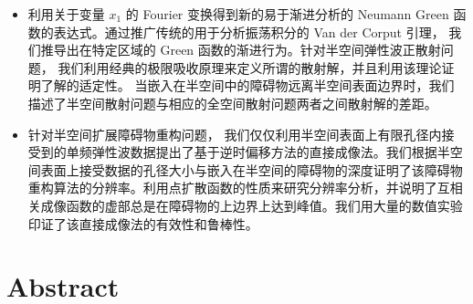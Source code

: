 \begin{itemize}
	\item  利用关于变量 $x_1$ 的 Fourier 变换得到新的易于渐进分析的 Neumann Green 函数的表达式。通过推广传统的用于分析振荡积分的 Van der Corput 引理， 我们推导出在特定区域的 Green 函数的渐进行为。针对半空间弹性波正散射问题， 我们利用经典的极限吸收原理来定义所谓的散射解，并且利用该理论证明了解的适定性。 当嵌入在半空间中的障碍物远离半空间表面边界时，我们描述了半空间散射问题与相应的全空间散射问题两者之间散射解的差距。
	
	\item 针对半空间扩展障碍物重构问题， 我们仅仅利用半空间表面上有限孔径内接受到的单频弹性波数据提出了基于逆时偏移方法的直接成像法。我们根据半空间表面上接受数据的孔径大小与嵌入在半空间的障碍物的深度证明了该障碍物重构算法的分辨率。利用点扩散函数的性质来研究分辨率分析，并说明了互相关成像函数的虚部总是在障碍物的上边界上达到峰值。我们用大量的数值实验印证了该直接成像法的有效性和鲁棒性。
\end{itemize}

\chapter*{Abstract}%

